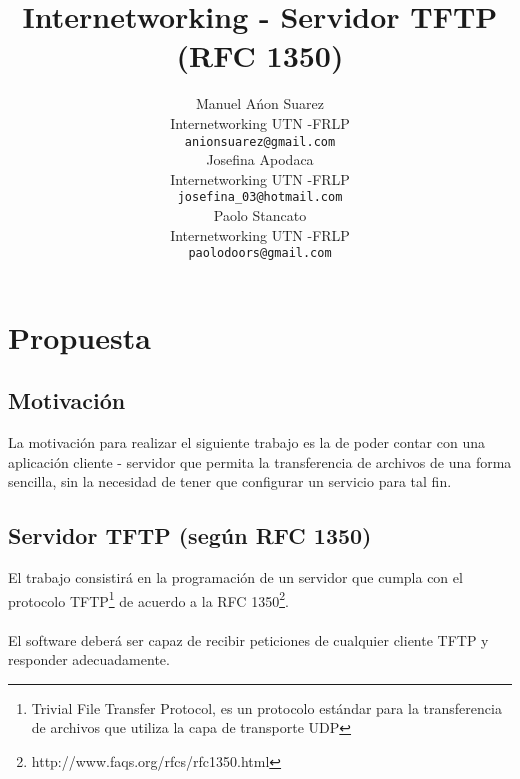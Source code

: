 \documentclass[12pt,a4paper,fleqn]{article}
\title{Internetworking - Servidor TFTP (RFC 1350)}
\author{
		Manuel A\'non Suarez\\{\small Internetworking UTN -FRLP}\\{\small \texttt{anionsuarez@gmail.com}}\\
		Josefina Apodaca\\{\small Internetworking UTN -FRLP}\\{\small \texttt{josefina\_03@hotmail.com}}\\
		Paolo Stancato\\{\small Internetworking UTN -FRLP}\\{\small \texttt{paolodoors@gmail.com}}\\
	}
\begin{document}
		\maketitle

		\section{Propuesta}
			\subsection{Motivaci\'on}
				La motivaci\'on para realizar el siguiente trabajo es la de poder contar con una aplicaci\'on cliente - servidor que permita la transferencia de archivos de una forma sencilla, sin la necesidad de tener que configurar un servicio para tal fin.
			\subsection{Servidor TFTP (seg\'un RFC 1350)}
				El trabajo consistir\'a en la programaci\'on de un servidor que cumpla con el protocolo TFTP\footnote{Trivial File Transfer Protocol, es un protocolo est\'andar para la transferencia de archivos que utiliza la capa de transporte UDP} de acuerdo a la RFC 1350\footnote{http://www.faqs.org/rfcs/rfc1350.html}.\\\\
				El software deber\'a ser capaz de recibir peticiones de cualquier cliente TFTP y responder adecuadamente.
\end{document}
